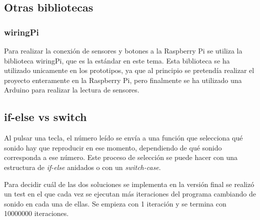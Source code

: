 

        \subsection{Otras bibliotecas} %
        \label{sub:OtrasLibrerias}

            \subsubsection{wiringPi} %
            \label{ssub:WiringPi}

                Para realizar la conexión de sensores y botones a la Raspberry Pi se utiliza la biblioteca
                wiringPi\cite{wiringPi}, que es la estándar en este tema. Esta biblioteca se ha utilizado unicamente en
                los prototipos, ya que al principio se pretendía realizar el proyecto enteramente en la Raspberry Pi,
                pero finalmente se ha utilizado una Arduino para realizar la lectura de sensores.



        \subsection{if-else vs switch} %
        \label{sub:if-else_vs_switch}

            Al pulsar una tecla, el número leído se envía a una función que selecciona qué sonido hay que reproducir en
            ese momento, dependiendo de qué sonido corresponda a ese número. Este proceso de selección se puede hacer
            con una estructura de \textit{if-else} anidados o con un \textit{switch-case}.

            Para decidir cuál de las dos soluciones se implementa en la versión final se realizó un test en el que cada
            vez se ejecutan más iteraciones del programa cambiando de sonido en cada una de ellas. Se empieza con 1
            iteración y se termina con 10000000 iteraciones.

